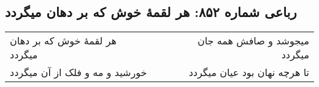 \begin{center}
\section*{رباعی شماره ۸۵۲: هر لقمهٔ خوش که بر دهان میگردد}
\label{sec:0852}
\begin{longtable}{l p{0.5cm} r}
هر لقمهٔ خوش که بر دهان میگردد
&&
میجوشد و صافش همه جان میگردد
\\
خورشید و مه و فلک از آن میگردد
&&
تا هرچه نهان بود عیان میگردد
\\
\end{longtable}
\end{center}
